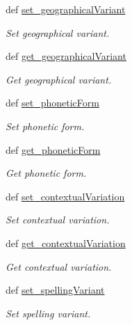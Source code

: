 \begin{DoxyCompactItemize}
def \hyperlink{classlmf_1_1src_1_1core_1_1form__representation_1_1_form_representation_a6ea94ec5271f4d004a97090a1dfca797}{set\+\_\+geographical\+Variant}
\begin{DoxyCompactList}\small\item\em Set geographical variant. \end{DoxyCompactList}\item 
def \hyperlink{classlmf_1_1src_1_1core_1_1form__representation_1_1_form_representation_a7856919f832d77bac3c4183fa63193b0}{get\+\_\+geographical\+Variant}
\begin{DoxyCompactList}\small\item\em Get geographical variant. \end{DoxyCompactList}\item 
def \hyperlink{classlmf_1_1src_1_1core_1_1form__representation_1_1_form_representation_a26df452a549ce25256429b0820b42cd5}{set\+\_\+phonetic\+Form}
\begin{DoxyCompactList}\small\item\em Set phonetic form. \end{DoxyCompactList}\item 
def \hyperlink{classlmf_1_1src_1_1core_1_1form__representation_1_1_form_representation_afd063ac9cf7a1c412010c2885be8b451}{get\+\_\+phonetic\+Form}
\begin{DoxyCompactList}\small\item\em Get phonetic form. \end{DoxyCompactList}\item 
def \hyperlink{classlmf_1_1src_1_1core_1_1form__representation_1_1_form_representation_a4cd93976760ea4d01d9c448eaf051395}{set\+\_\+contextual\+Variation}
\begin{DoxyCompactList}\small\item\em Set contextual variation. \end{DoxyCompactList}\item 
def \hyperlink{classlmf_1_1src_1_1core_1_1form__representation_1_1_form_representation_af6e1a07dd4ad7cfb56fc0dd82b38d019}{get\+\_\+contextual\+Variation}
\begin{DoxyCompactList}\small\item\em Get contextual variation. \end{DoxyCompactList}\item 
def \hyperlink{classlmf_1_1src_1_1core_1_1form__representation_1_1_form_representation_a99c2df557be9133fa942834b9a51bee5}{set\+\_\+spelling\+Variant}
\begin{DoxyCompactList}\small\item\em Set spelling variant. \end{DoxyCompactList}\item 

\end{DoxyCompactItemize}
